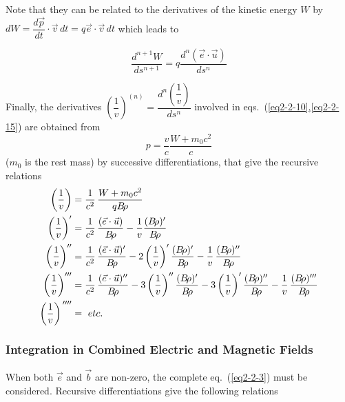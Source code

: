 \noindent Note that they can be related to the derivatives of the 
kinetic energy $ W $ by $dW = \dfrac{d\vec  p }{ dt} \cdot\vec  v\, dt = q\vec  e\cdot\vec  v\, dt $
which leads to

\begin{equation}
	\dfrac{ d^{n+1}W }{ds^{n+1}} = q \dfrac{ d^n (\vec  e\cdot\vec  u) }{ ds^n}
	\label{eq2-2-16}
\end{equation}

\noindent Finally, the derivatives $ \left(\dfrac{ 1 }{ v}\right)^{(n)} =
\dfrac{ d^n \left(\dfrac{1 }{ v}\right) }{ ds^n} $ involved in 
eqs.~(\ref{eq2-2-10},\ref{eq2-2-15}) are 
obtained from 
$$ p=\dfrac{ v }{ c} \dfrac{ W+m_0 c^2 }{ c} $$
 ($m_0$ is the rest mass) by successive differentiations, that give the recursive relations
%
\begin{equation}
	\begin{aligned}
		 \left(\dfrac{1}{ v}\right) 
		   & =   \dfrac{ 1 }{ c^2} \, 
		     \dfrac{W+m_0 c^2 }{ q\Br}\\
		 \left(\dfrac{1 }{ v}\right)^\prime 
		   & =  \dfrac{ 1 }{ c^2}\,
		     \dfrac{(\vec  e\cdot\vec  u) }{ \Br} 
		      - \dfrac{1 }{ v} \dfrac{(\Br )^\prime }{ \Br}\\
		 \left(\dfrac{1 }{ v}\right)^{\prime\prime}
		   & = 	\dfrac{ 1 }{ c^2} \,
		     \dfrac{(\vec  e\cdot\vec  u)^\prime }{ \Br}  
		     - 2\left(\dfrac{1}{v}\right)^\prime \dfrac{ (\Br )^\prime }{ \Br}  
		     - \dfrac{1 }{ v}\, \dfrac{(\Br)^{\prime\prime} }{ \Br}\\
		 \left(\dfrac{1 }{v}\right)^{\prime\prime\prime} 
		   & = \dfrac{ 1 }{c^2}\, \dfrac{(\vec  e\cdot\vec  u)^{\prime\prime} }{ \Br}  
		     -3\left(\dfrac{1 }{v}\right)^{\prime\prime}  \dfrac{(\Br )^\prime }{ \Br}  
		     -3\left(\dfrac{1 }{v}\right)^\prime \dfrac{(\Br )^{\prime\prime} }{ \Br}  
		     - \dfrac{1 }{ v}\, \dfrac{(\Br)^{\prime\prime\prime} }{ \Br}\\
		 \left(\dfrac{1 }{v}\right)^{\quaprime} 
                   & = ~ etc.
	\end{aligned}
	\label{eq2-2-17}
\end{equation}



 \subsubsection{Integration in Combined Electric and Magnetic Fields} \label{sec2.2.3}%

 When both $ \vec  e $ and $ \vec  b $ are non-zero, the complete 
 eq.~(\ref{eq2-2-3}) must 
be considered. Recursive differentiations give the following relations 

